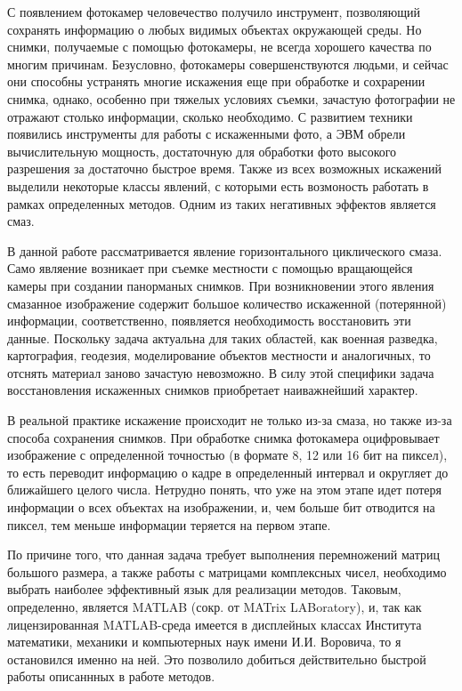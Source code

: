 \documentclass[a4paper]{article}
\theoremstyle{definition}
\begin{document}
    С появлением фотокамер человечество получило инструмент, позволяющий сохранять информацию о любых видимых объектах окружающей среды. Но снимки, получаемые с помощью фотокамеры, не всегда хорошего качества по многим причинам. Безусловно, фотокамеры совершенствуются людьми, и сейчас они способны устранять многие искажения еще при обработке и сохрарении снимка, однако, особенно при тяжелых условиях съемки, зачастую фотографии не отражают столько информации, сколько необходимо. С развитием техники появились инструменты для работы с искаженными фото, а ЭВМ обрели вычислительную мощность, достаточную для обработки фото высокого разрешения за достаточно быстрое время. Также из всех возможных искажений выделили некоторые классы явлений, с которыми есть возмоность работать в рамках определенных методов. Одним из таких негативных эффектов является смаз.


    В данной работе рассматривается явление горизонтального циклического смаза. Само являение возникает при съемке местности с помощью вращающейся камеры при создании панорманых снимков. При возникновении этого явления смазанное изображение содержит большое количество искаженной (потерянной) информации, соответственно, появляется необходимость восстановить эти данные. Поскольку задача актуальна для таких областей, как военная разведка, картография, геодезия, моделирование объектов местности и аналогичных, то отснять материал заново зачастую невозможно. В силу этой специфики задача восстановления искаженных снимков приобретает наиважнейший характер.


    В реальной практике искажение происходит не только из-за смаза, но также из-за способа сохранения снимков. При обработке снимка фотокамера оцифровывает изображение с определенной точностью (в формате 8, 12 или 16 бит на пиксел), то есть переводит информацию о кадре в определенный интервал и округляет до ближайшего целого числа. Нетрудно понять, что уже на этом этапе идет потеря информации о всех объектах на изображении, и, чем больше бит отводится на пиксел, тем меньше информации теряется на первом этапе.


    По причине того, что данная задача требует выполнения перемножений матриц большого размера, а также работы с матрицами комплексных чисел, необходимо выбрать наиболее эффективный язык для реализации методов. Таковым, определенно, является MATLAB (сокр. от MATrix LABoratory), и, так как лицензированная MATLAB-среда имеется в  дисплейных классах Института математики, механики и компьютерных наук имени И.И. Воровича, то я остановился именно на ней. Это позволило добиться действительно быстрой работы описаннных в работе методов.
\end{document}
